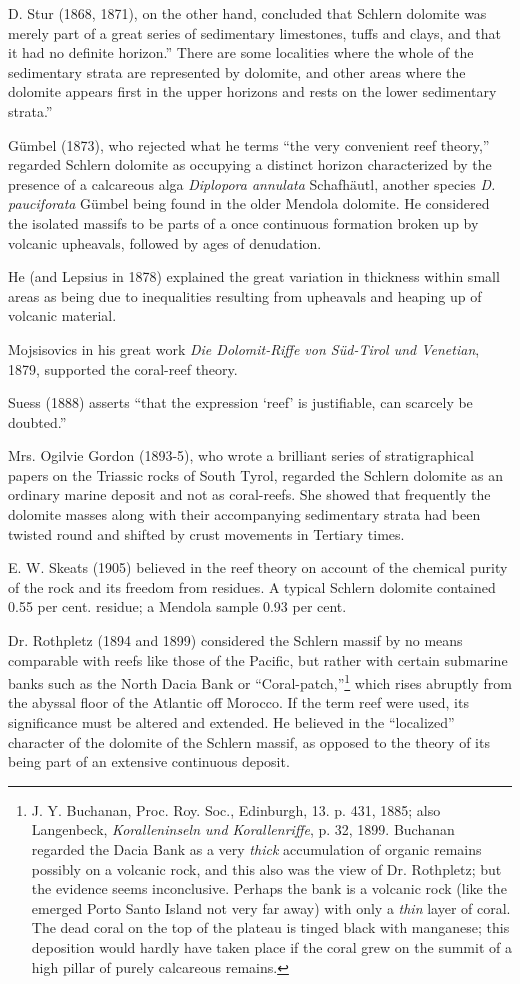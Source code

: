 \documentclass[a4paper, 12pt, oneside]{article}
\begin{document}
D. Stur (1868, 1871), on the other hand, concluded that Schlern dolomite was merely part of a great series of sedimentary limestones, tuffs and clays, and that it had no definite horizon.'' There are some localities where the whole of the sedimentary strata are represented by dolomite, and other areas where the dolomite appears first in the upper horizons and rests on the lower sedimentary strata.''

Gümbel (1873), who rejected what he terms ``the very convenient reef theory,'' regarded Schlern dolomite as occupying a distinct horizon characterized by the presence of a calcareous alga \emph{Diplopora annulata} Schafhäutl, another species \emph{D. pauciforata} Gümbel being found in the older Mendola dolomite. He considered the isolated massifs to be parts of a once continuous formation broken up by volcanic upheavals, followed by ages of denudation.

He (and Lepsius in 1878) explained the great variation in thickness within small areas as being due to inequalities resulting from upheavals and heaping up of volcanic material.

Mojsisovics in his great work \emph{Die Dolomit-Riffe von Süd-Tirol und Venetian}, 1879, supported the coral-reef theory.

Suess (1888) asserts ``that the expression `reef' is justifiable, can scarcely be doubted.''

Mrs. Ogilvie Gordon (1893-5), who wrote a brilliant series of stratigraphical papers on the Triassic rocks of South Tyrol, regarded the Schlern dolomite as an ordinary marine deposit and not as coral-reefs. She showed that frequently the dolomite masses along with their accompanying sedimentary strata had been twisted round and shifted by crust movements in Tertiary times.

E. W. Skeats (1905) believed in the reef theory on account of the chemical purity of the rock and its freedom from residues. A typical Schlern dolomite contained 0.55 per cent. residue; a Mendola sample 0.93 per cent.

Dr. Rothpletz (1894 and 1899) considered the Schlern massif by no means comparable with reefs like those of the Pacific, but rather with certain submarine banks such as the North Dacia Bank or ``Coral-patch,''\footnote{J. Y. Buchanan, Proc. Roy. Soc., Edinburgh, 13. p. 431, 1885; also Langenbeck, \emph{Koralleninseln und Korallenriffe}, p. 32, 1899. Buchanan regarded the Dacia Bank as a very \emph{thick} accumulation of organic remains possibly on a volcanic rock, and this also was the view of Dr. Rothpletz; but the evidence seems inconclusive. Perhaps the bank is a volcanic rock (like the emerged Porto Santo Island not very far away) with only a \emph{thin} layer of coral. The dead coral on the top of the plateau is tinged black with manganese; this deposition would hardly have taken place if the coral grew on the summit of a high pillar of purely calcareous remains.} which rises abruptly from the abyssal floor of the Atlantic off Morocco. If the term reef were used, its significance must be altered and extended. He believed in the ``localized'' character of the dolomite of the Schlern massif, as opposed to the theory of its being part of an extensive continuous deposit.
\end{document}
